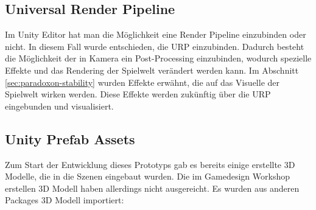 \subsection{Universal Render Pipeline}
Im Unity Editor hat man die Möglichkeit eine Render Pipeline einzubinden oder nicht. In diesem Fall wurde entschieden, die \ac{URP} einzubinden. Dadurch besteht die Möglichkeit der in Kamera ein Post-Processing einzubinden, wodurch spezielle Effekte und das Rendering der Spielwelt verändert werden kann. Im Abschnitt \ref{sec:paradoxon-stability}  wurden Effekte erwähnt, die auf das Visuelle der Spielwelt wirken werden. Diese Effekte werden zukünftig über die \ac{URP} eingebunden und visualisiert.

\subsection{Unity Prefab Assets}\label{sec:extra-assets}
Zum Start der Entwicklung dieses Prototyps gab es bereits einige erstellte \ac{3D} Modelle, die in die Szenen eingebaut wurden. Die im Gamedesign Workshop erstellen \ac{3D} Modell haben allerdings nicht ausgereicht. Es wurden aus anderen Packages \ac{3D} Modell importiert:





